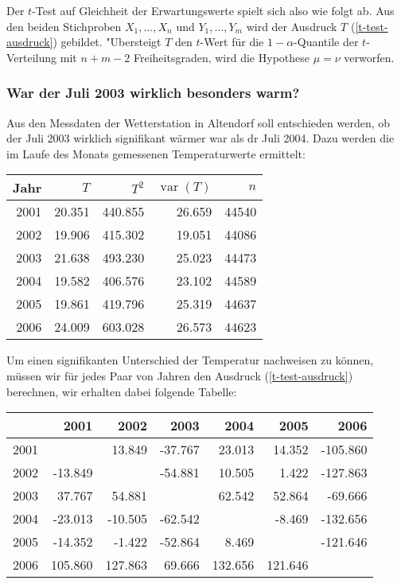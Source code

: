 Der $t$-Test auf Gleichheit der Erwartungswerte spielt sich also wie folgt
ab.
Aus den beiden Stichproben $X_1,\dots,X_n$ und $Y_1,\dots,Y_m$ wird
der Ausdruck $T$ (\ref{t-test-ausdruck}) gebildet.
"Ubersteigt $T$ den $t$-Wert für die $1-\alpha$-Quantile der $t$-Verteilung
mit $n+m-2$ Freiheitsgraden, wird die Hypothese $\mu=\nu$ verworfen.

\subsubsection{War der Juli 2003 wirklich besonders warm?} \label{julitemperaturen}
Aus den Messdaten der Wetterstation in Altendorf soll entschieden werden,
ob der Juli 2003 wirklich signifikant wärmer war als dr Juli 2004.
Dazu werden die im Laufe des Monats gemessenen Temperaturwerte
ermittelt:

\begin{center}
\begin{tabular}{|r|r|r|r|r|}
\hline
Jahr&$T$&$T^2$&$\operatorname{var}(T)$&$n$\\
\hline
2001&20.351&440.855&26.659&44540\\
2002&19.906&415.302&19.051&44086\\
2003&21.638&493.230&25.023&44473\\
2004&19.582&406.576&23.102&44589\\
2005&19.861&419.796&25.319&44637\\
2006&24.009&603.028&26.573&44623\\
\hline
\end{tabular}
\end{center}

Um einen signifikanten Unterschied der Temperatur nachweisen zu können,
müssen wir für jedes Paar von Jahren den Ausdruck (\ref{t-test-ausdruck})
berechnen, wir erhalten dabei folgende Tabelle:

\begin{center}
\begin{tabular}{|r|rrrrrr|}
\hline
    &    2001&    2002&    2003&    2004&    2005&     2006\\
\hline
2001&        &  13.849& -37.767&  23.013&  14.352& -105.860\\
2002& -13.849&        & -54.881&  10.505&   1.422& -127.863\\
2003&  37.767&  54.881&        &  62.542&  52.864&  -69.666\\
2004& -23.013& -10.505& -62.542&        &  -8.469& -132.656\\
2005& -14.352&  -1.422& -52.864&   8.469&        & -121.646\\
2006& 105.860& 127.863&  69.666& 132.656& 121.646&         \\
\hline
\end{tabular}
\end{center}


